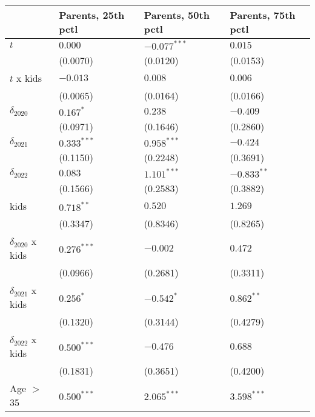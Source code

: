 \begin{tabular}{llll}
\toprule
{} & Parents, 25th pctl & Parents, 50th pctl & Parents, 75th pctl \\
\midrule
$t$                    &            $0.000$ &     $-0.077^{***}$ &            $0.015$ \\
                       &           (0.0070) &           (0.0120) &           (0.0153) \\
$t$ x kids             &           $-0.013$ &            $0.008$ &            $0.006$ \\
                       &           (0.0065) &           (0.0164) &           (0.0166) \\
$\delta_{2020}$        &          $0.167^*$ &            $0.238$ &           $-0.409$ \\
                       &           (0.0971) &           (0.1646) &           (0.2860) \\
$\delta_{2021}$        &      $0.333^{***}$ &      $0.958^{***}$ &           $-0.424$ \\
                       &           (0.1150) &           (0.2248) &           (0.3691) \\
$\delta_{2022}$        &            $0.083$ &      $1.101^{***}$ &      $-0.833^{**}$ \\
                       &           (0.1566) &           (0.2583) &           (0.3882) \\
kids                   &       $0.718^{**}$ &            $0.520$ &            $1.269$ \\
                       &           (0.3347) &           (0.8346) &           (0.8265) \\
$\delta_{2020}$ x kids &      $0.276^{***}$ &           $-0.002$ &            $0.472$ \\
                       &           (0.0966) &           (0.2681) &           (0.3311) \\
$\delta_{2021}$ x kids &          $0.256^*$ &         $-0.542^*$ &       $0.862^{**}$ \\
                       &           (0.1320) &           (0.3144) &           (0.4279) \\
$\delta_{2022}$ x kids &      $0.500^{***}$ &           $-0.476$ &            $0.688$ \\
                       &           (0.1831) &           (0.3651) &           (0.4200) \\
Age $>$ 35             &      $0.500^{***}$ &      $2.065^{***}$ &      $3.598^{***}$ \\

\end{tabular}
